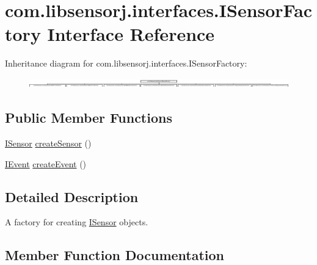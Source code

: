 \hypertarget{interfacecom_1_1libsensorj_1_1interfaces_1_1ISensorFactory}{}\section{com.\+libsensorj.\+interfaces.\+I\+Sensor\+Factory Interface Reference}
\label{interfacecom_1_1libsensorj_1_1interfaces_1_1ISensorFactory}
Inheritance diagram for com.\+libsensorj.\+interfaces.\+I\+Sensor\+Factory\+:\begin{figure}[H]
\begin{center}
\leavevmode
\includegraphics[height=0.430108cm]{interfacecom_1_1libsensorj_1_1interfaces_1_1ISensorFactory}
\end{center}
\end{figure}
\subsection*{Public Member Functions}
\begin{DoxyCompactItemize}
\item 
\hyperlink{interfacecom_1_1libsensorj_1_1interfaces_1_1ISensor}{I\+Sensor} \hyperlink{interfacecom_1_1libsensorj_1_1interfaces_1_1ISensorFactory_ac14c6d566c37c6a79c6db1e85634f25d}{create\+Sensor} ()
\item 
\hyperlink{classcom_1_1libsensorj_1_1interfaces_1_1IEvent}{I\+Event} \hyperlink{interfacecom_1_1libsensorj_1_1interfaces_1_1ISensorFactory_a2b074d01287a4e64677097255ba9e768}{create\+Event} ()
\end{DoxyCompactItemize}


\subsection{Detailed Description}
A factory for creating \hyperlink{interfacecom_1_1libsensorj_1_1interfaces_1_1ISensor}{I\+Sensor} objects. 

\subsection{Member Function Documentation}
\hypertarget{interfacecom_1_1libsensorj_1_1interfaces_1_1ISensorFactory_a2b074d01287a4e64677097255ba9e768}{}
